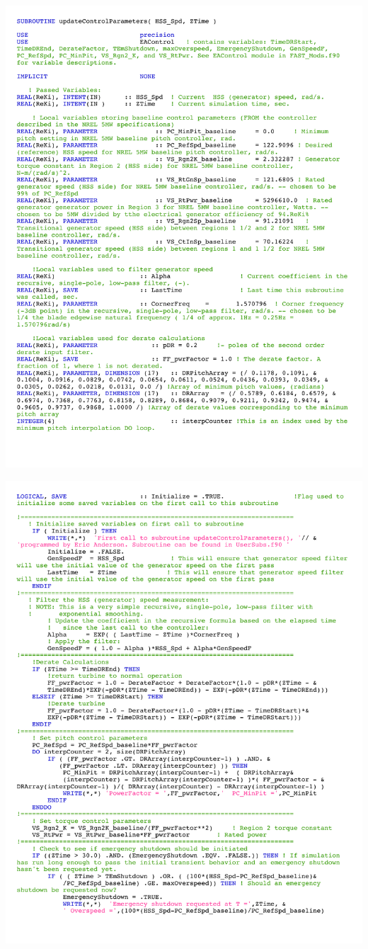 \noindent
\includegraphics[width=\linewidth]{Figures/AppendixDFigures/figD-3A.pdf}

\noindent
\includegraphics[width=\linewidth]{Figures/AppendixDFigures/figD-3B.pdf}

